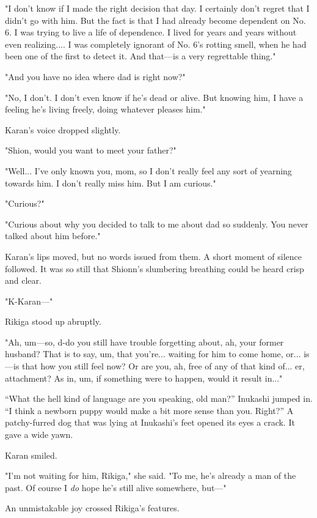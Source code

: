 "I don't know if I made the right decision that day. I certainly don't
regret that I didn't go with him. But the fact is that I had already
become dependent on No. 6. I was trying to live a life of dependence. I
lived for years and years without even realizing.... I was completely
ignorant of No. 6's rotting smell, when he had been one of the first to
detect it. And that---is a very regrettable thing."

"And you have no idea where dad is right now?"

"No, I don't. I don't even know if he's dead or alive. But knowing him,
I have a feeling he's living freely, doing whatever pleases him."

Karan's voice dropped slightly.

"Shion, would you want to meet your father?"

"Well... I've only known you, mom, so I don't really feel any sort of
yearning towards him. I don't really miss him. But I am curious."

"Curious?"

"Curious about why you decided to talk to me about dad so suddenly. You
never talked about him before."

Karan's lips moved, but no words issued from them. A short moment of
silence followed. It was so still that Shionn's slumbering breathing
could be heard crisp and clear.

\mybreak

"K-Karan---"

Rikiga stood up abruptly.

"Ah, um---so, d-do you still have trouble forgetting about, ah, your
former husband? That is to say, um, that you're... waiting for him to
come home, or... is---is that how you still feel now? Or are you, ah, free
of any of that kind of... er, attachment? As in, um, if something were
to happen, would it result in..."

``What the hell kind of language are you speaking, old man?'' Inukashi
jumped in. ``I think a newborn puppy would make a bit more sense than
you. Right?'' A patchy-furred dog that was lying at Inukashi's feet
opened its eyes a crack. It gave a wide yawn.~

Karan smiled.

"I'm not waiting for him, Rikiga," she said. "To me, he's already a man
of the past. Of course I \emph{do} hope he's still alive somewhere, but---"

An unmistakable joy crossed Rikiga's features.

